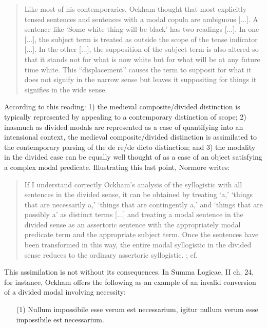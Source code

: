 \documentclass[]{article}
\begin{document}
\begin{quote}
	Like most of his contemporaries, Ockham thought that most explicitly tensed sentences and sentences with a modal copula are ambiguous [...]. A sentence like `Some white thing will be black' has two readings [...]. In one [...], the subject term is treated as outside the scope of the tense indicator [...]. In the other [...], the supposition of the subject term is also altered so that it stands not for what is now white but for what will be at any future time white. This “displacement” causes the term to supposit for what it does not signify in the narrow sense but leaves it suppositing for things it signifies in the wide sense. \cite[pp. 39-40]{Normore1999}
\end{quote}


According to this reading: 1) the medieval composite/divided distinction is typically represented by appealing to a contemporary distinction of scope; 2) inasmuch as divided modals are represented as a case of quantifying into an intensional context, the medieval composite/divided distinction is assimilated to the contemporary parsing of the de re/de dicto distinction;  and 3) the modality in the divided case can be equally well thought of as a case of an object satisfying a complex modal predicate. Illustrating this last point, Normore writes: 

\begin{quote}
	If I understand correctly Ockham's analysis of the syllogistic with all sentences in the divided sense, it can be obtained by treating `a,' `things that are necessarily a,' `things that are contingently a,' and `things that are possibly a' as distinct terms [...] and treating a modal sentence in the divided sense as an assertoric sentence with the appropriately modal predicate term and the appropriate subject term. Once the sentences have been transformed in this way, the entire modal syllogistic in the divided sense reduces to the ordinary assertoric syllogistic. \cite[p. 49]{Normore1999}; cf. \cite{DutilhNovaes2004}
\end{quote}

This assimilation is not without its consequences. In Summa Logicae, II ch. 24, for instance, Ockham offers the following as an example of an invalid conversion of a divided modal involving necessity: 
\begin{enumerate} 
	\item[(1)] Nullum impossibile esse verum est necessarium, igitur nullum verum esse impossibile est necessarium. \cite[II.24, p. 329]{OckhamSL}
\end{enumerate}
\end{document}
